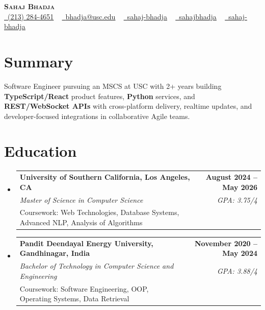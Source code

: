 \documentclass[letterpaper,10pt]{article}
\makeatletter
\newcommand{\resumeEduSubheading}[5]{\vspace{-1pt}\item\begin{tabular*}{1.0\textwidth}[t]{l@{\extracolsep{\fill}}r}\textbf{#1} & \textbf{\small #2} \\\textit{\small #3} & \textit{\small #4} \\\small #5 & \\\end{tabular*}\vspace{-4pt}}
\newcommand{\resumeSubHeadingListStart}{\begin{itemize}[leftmargin=0.0in, label={}]}
\newcommand{\resumeSubHeadingListEnd}{\end{itemize}}
\makeatother
\begin{document}
\begin{center}
{\Huge \scshape \textbf{Sahaj Bhadja}} \\ \vspace{1pt}
\small \href{tel:(213) 284-4651}{\faPhone\ \underline{(213) 284-4651}} ~ \href{mailto: bhadja@usc.edu}{\raisebox{-0.2\height}\faEnvelope\ \underline{bhadja@usc.edu}} ~
\href{https://www.linkedin.com/in/sahaj-bhadja/}{\raisebox{-0.2\height}\faLinkedin\ \underline{sahaj-bhadja}} ~ \href{https://github.com/SAHAJ-BHADJA}{\raisebox{-0.2\height}\faGithub\ \underline{sahajbhadja}} ~
\href{https://sahaj-bhadja.vercel.app/}{\raisebox{-0.2\height}\faGlobe\ \underline{sahaj-bhadja}}
\end{center}
\vspace{-16pt}
\section{Summary}
\begin{itemize}[leftmargin=0.15in, label={}]
\small{\item{Software Engineer pursuing an MSCS at USC with 2+ years building \textbf{TypeScript/React} product features, \textbf{Python} services, and \textbf{REST/WebSocket APIs} with cross-platform delivery, realtime updates, and developer-focused integrations in collaborative Agile teams.}}
\end{itemize}
\vspace{-6pt}
\section{Education}
\resumeSubHeadingListStart
\resumeEduSubheading{University of Southern California, Los Angeles, CA}{August 2024 -- May 2026}{Master of Science in Computer Science}{GPA: 3.75/4}{Coursework: Web Technologies, Database Systems, Advanced NLP, Analysis of Algorithms}
\vspace{-9pt}
\resumeEduSubheading{Pandit Deendayal Energy University, Gandhinagar, India}{November 2020 -- May 2024}{Bachelor of Technology in Computer Science and Engineering}{GPA: 3.88/4}{Coursework: Software Engineering, OOP, Operating Systems, Data Retrieval}
\resumeSubHeadingListEnd
\vspace{-6pt}
\end{document}
